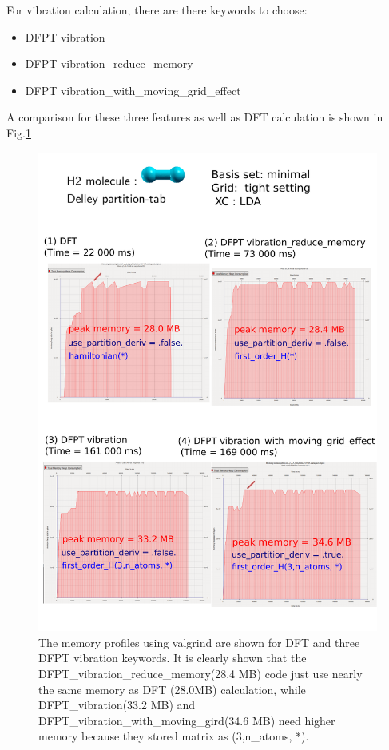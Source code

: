 For vibration calculation, there are there keywords to choose:
\begin{itemize}
\item DFPT vibration 
\item DFPT vibration\_reduce\_memory
\item DFPT vibration\_with\_moving\_grid\_effect
\end{itemize}
A comparison for these three features as well as DFT calculation is shown in Fig.\ref{fig:DFPT_compare}



\begin{figure}
\includegraphics[width=1.0\columnwidth]{DFPT_compare}
\caption{The memory profiles using valgrind are shown for DFT and three DFPT vibration keywords.    It is clearly shown that the DFPT\_vibration\_reduce\_memory(28.4 MB) code just use nearly the same memory as DFT (28.0MB) calculation, while DFPT\_vibration(33.2 MB) and DFPT\_vibration\_with\_moving\_gird(34.6 MB) need higher memory because they stored matrix as
    (3,n\_atoms, *).  %
%
      }
\label{fig:DFPT_compare}
\end{figure}




